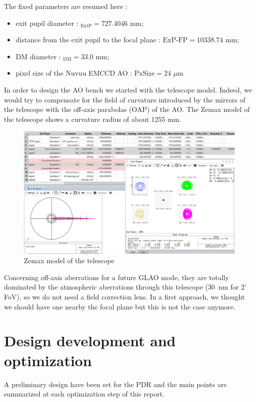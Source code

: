 \documentclass[12pt,a4paper]{article}
\begin{document}
The fixed parameters are resumed here :
\begin{itemize}
	\item exit pupil diameter : \diameter$_{\text{ExtP}} = 727.4046$ mm;
	\item distance from the exit pupil to the focal plane : $\overline{\text{ExP-FP}} = 10338.74$ mm; 
	\item DM diameter : \diameter$_{\text{DM}} = 33.0$ mm;
	\item pixel size of the Nuvuu EMCCD AO : $\text{PxSize} = 24$ $\mu$m
\end{itemize}
\newpage
In order to design the AO bench we started with the telescope model. Indeed, we would try to compensate for the field of curvature introduced by the mirrors of the telescope with the off-axis parabolas (OAP) of the AO. The Zemax model of the telescope shows a curvature radius of about 1255 mm.
\begin{figure}[H]
	\begin{center}
		\includegraphics[width=\textwidth]{images/Zemax_model_telescope.PNG}
		\caption{Zemax model of the telescope}\label{fig:Zemax_model_telescope}
	\end{center}
\end{figure}

Concerning off-axis aberrations for a future GLAO mode, they are totally dominated by the atmospheric aberrations through this telescope (30~nm for 2' FoV), so we do not need a field correction lens. In a first approach, we thought we should have one nearby the focal plane but this is not the case anymore.

\newpage
\section{Design development and optimization}
A preliminary design have been set for the PDR and the main points are summarized at each optimization step of this report.
\end{document}
